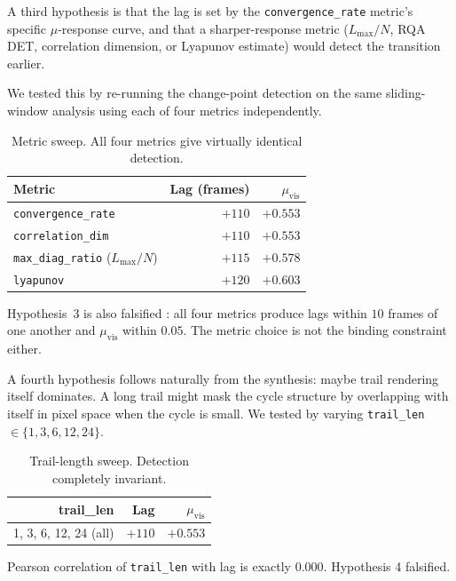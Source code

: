 \documentclass[11pt,a4paper]{article}
\begin{document}
A third hypothesis is that the lag is set by the
\texttt{convergence\_rate} metric's specific $\mu$-response curve,
and that a sharper-response metric ($L_{\max}/N$, RQA DET,
correlation dimension, or Lyapunov estimate) would detect the
transition earlier.

We tested this by re-running the change-point detection on the same
sliding-window analysis using each of four metrics independently.

\begin{table}[h]
\centering
\caption{Metric sweep. All four metrics give virtually identical
detection.}
\label{tab:metric-sweep}
\begin{tabular}{lrr}
\toprule
Metric & Lag (frames) & $\mu_{\text{vis}}$ \\
\midrule
\texttt{convergence\_rate} & $+110$ & $+0.553$ \\
\texttt{correlation\_dim} & $+110$ & $+0.553$ \\
\texttt{max\_diag\_ratio} ($L_{\max}/N$) & $+115$ & $+0.578$ \\
\texttt{lyapunov} & $+120$ & $+0.603$ \\
\bottomrule
\end{tabular}
\end{table}

Hypothesis~3 is also falsified : all four metrics produce lags within
$10$ frames of one another and $\mu_{\text{vis}}$ within $0.05$. The
metric choice is not the binding constraint either.

A fourth hypothesis follows naturally from the synthesis: maybe trail
rendering itself dominates. A long trail might mask the cycle
structure by overlapping with itself in pixel space when the cycle is
small. We tested by varying \verb|trail_len| $\in \{1, 3, 6, 12, 24\}$.

\begin{table}[h]
\centering
\caption{Trail-length sweep. Detection completely invariant.}
\label{tab:trail-sweep}
\begin{tabular}{rrr}
\toprule
trail\_len & Lag & $\mu_{\text{vis}}$ \\
\midrule
1, 3, 6, 12, 24 (all) & $+110$ & $+0.553$ \\
\bottomrule
\end{tabular}
\end{table}

Pearson correlation of \verb|trail_len| with lag is exactly $0.000$.
Hypothesis 4 falsified.
\end{document}
